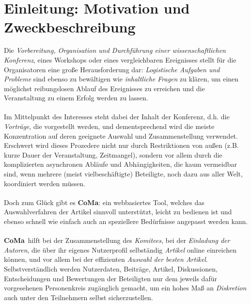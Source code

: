\documentclass[headexclude,footexclude,12pt,BCOR0pt,DIV15]{scrartcl}
\newcommand{\CoMa}{\textbf{CoMa}}
\begin{document}
\pagebreak

\pagestyle{headings}  \setcounter{page}{1}



\section{Einleitung: Motivation und Zweckbeschreibung}

    Die \emph{Vorbereitung, Organisation und Durchf\"{u}hrung einer wissenschaftlichen Konferenz},
    eines Workshops oder eines vergleichbaren Ereignisses stellt f\"{u}r die Organisatoren
    eine gro{\ss}e Herausforderung dar: \emph{Logistische Aufgaben und Probleme} sind ebenso zu
    bew\"{a}ltigen wie \emph{inhaltliche Fragen} zu kl\"{a}ren, um einen m\"{o}glichst reibungslosen Ablauf
    des Ereignisses zu erreichen und die Veranstaltung zu einem Erfolg werden zu lassen.
    \\
    \\
    Im Mittelpunkt des Interesses steht dabei der Inhalt der Konferenz, d.h. die \emph{Vortr\"{a}ge},
    die vorgestellt werden, und dementsprechend wird die meiste Konzentration auf deren
    geeignete Auswahl und Zusammenstellung verwendet. Erschwert wird dieses Prozedere
    nicht nur durch Restriktionen von au{\ss}en (z.B. kurze Dauer der Veranstaltung, Zeitmangel),
    sondern vor allem durch die komplizierten asynchronen Abl\"{a}ufe und Abh\"{a}ngigkeiten, die kaum
    vermeidbar sind, wenn mehrere (meist vielbesch\"{a}ftigte) Beteiligte, noch dazu aus aller Welt,
    koordiniert werden m\"{u}ssen.
    \\
    \\
    Doch zum Gl\"{u}ck gibt es \CoMa: ein webbasiertes Tool, welches das Auswahlverfahren der Artikel
    sinnvoll unterst\"{u}tzt, leicht zu bedienen ist und ebenso schnell wie einfach auch an speziellere
    Bed\"{u}rfnisse angepasst werden kann.
    \\
    \\
    \CoMa\ hilft bei der Zusammenstellung des \emph{Komitees}, bei der \emph{Einladung der Autoren}, die
    \"{u}ber ihr eigenes Nutzerprofil selbst\"{a}ndig \emph{Artikel} online einreichen k\"{o}nnen, und vor
    allem bei der effizienten \emph{Auswahl der besten Artikel}. Selbstverst\"{a}ndlich werden Nutzerdaten,
    Beitr\"{a}ge, Artikel, Diskussionen, Entscheidungen und Bewertungen der Beteiligten nur dem
    jeweils daf\"{u}r vorgesehenen Personenkreis zug\"{a}nglich gemacht, um ein hohes Ma{\ss} an \emph{Diskretion}
    auch unter den Teilnehmern selbst sicherzustellen.
\end{document}
